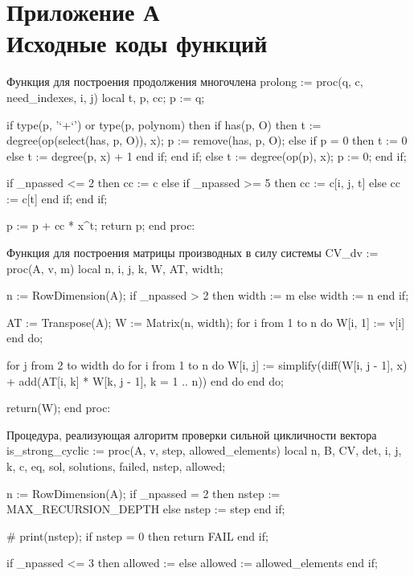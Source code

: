 \section{Приложение А \\ Исходные коды функций}

Функция для построения продолжения многочлена
prolong := proc(q, c, need_indexes, i, j)
    local t, p, cc;
    p := q;
    
    if type(p, '`+`') or type(p, polynom) then
        if has(p, O) then
            t := degree(op(select(has, p, O)), x);
            p := remove(has, p, O);
        else
            if p = 0 then
                t := 0
            else
                t := degree(p, x) + 1
            end if;
        end if;
    else
        t := degree(op(p), x);
        p := 0;
    end if;
    
    if _npassed <= 2 then
        cc := c
    else
        if _npassed >= 5 then
            cc := c[i, j, t]
        else
            cc := c[t]
        end if;
    end if;
    
    
    p := p + cc * x^t;
    return p;
    end proc:

Функция для построения матрицы производных в силу системы
CV_dv := proc(A, v, m)
    local n, i, j, k, W, AT, width;
    
    n := RowDimension(A);
    if _npassed > 2 then
        width := m
    else
        width := n
    end if;
    
    AT := Transpose(A);
    W := Matrix(n, width);
    for i from 1 to n do
        W[i, 1] := v[i]
    end do;
    
    for j from 2 to width do
        for i from 1 to n do
            W[i, j] := simplify(diff(W[i, j - 1], x) + add(AT[i, k] * W[k, j - 1], k = 1 .. n))
        end do
    end do;
    
    return(W);
    end proc:

Процедура, реализующая алгоритм проверки сильной цикличности вектора
is_strong_cyclic := proc(A, v, step, allowed_elements)
    local n, B, CV, det, i, j, k, c, eq, sol, solutions, failed, nstep, allowed;
    
    n := RowDimension(A);
    if _npassed = 2 then
        nstep := MAX_RECURSION_DEPTH
    else
        nstep := step
    end if;
    
    # print(nstep);
    if nstep = 0 then
        return FAIL
    end if;
    
    if _npassed <= 3 then
        allowed := {}
    else
        allowed := allowed_elements
    end if;
    

